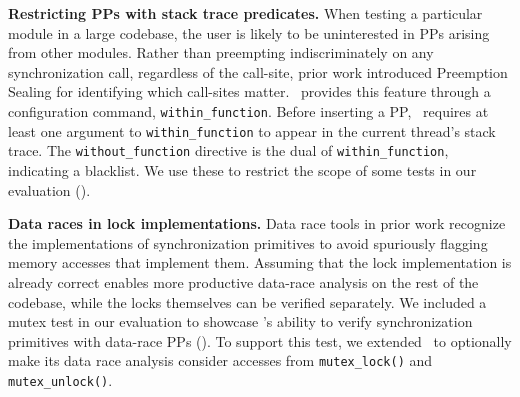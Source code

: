 {\bf Restricting PPs with stack trace predicates.}
When testing a particular module in a large codebase,
the user is likely to be uninterested in PPs arising from other modules.
Rather than preempting indiscriminately on any synchronization call, regardless of the call-site,
prior work introduced Preemption Sealing \cite{sealing} for identifying which call-sites matter.
\landslide~provides this feature through a configuration command, {\tt within\_function}.
Before inserting a PP, \landslide~requires at least one argument to {\tt within\_function} to appear in the current thread's stack trace.
The {\tt without\_\allowbreak{}function} directive is the dual of {\tt within\_function}, indicating a blacklist.
We use these to restrict the scope of some tests in our evaluation (\sect{\ref{sec:testsuite}}).

{\bf Data races in lock implementations.}
Data race tools in prior work \cite{tsan,portend} recognize the implementations of synchronization primitives to avoid spuriously flagging memory accesses %
that implement them.
Assuming that the lock implementation is already correct enables more productive data-race analysis on the rest of the codebase,
while the locks themselves can be verified separately.
We included a mutex test in our evaluation
to showcase \quicksand's ability to verify synchronization primitives with data-race PPs
(\sect{\ref{sec:testsuite}}).
To support this test, we extended \landslide~to
optionally make its data race analysis consider accesses from {\tt mutex\_lock()} and {\tt mutex\_unlock()}.

